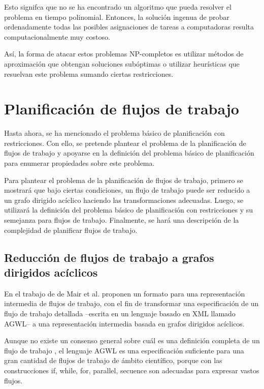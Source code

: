 Esto signifca que no se ha encontrado un algoritmo que pueda resolver el problema en tiempo polinomial. Entonces, la solución ingenua de probar ordenadamente todas las posibles asignaciones de tareas a computadoras resulta computacionalmente muy costoso.

Así, la forma de atacar estos problemas NP-completos es utilizar métodos de aproximación \cite{leiserson2001introduction} que obtengan soluciones subóptimas o utilizar heurísticas que resuelvan este problema sumando ciertas restricciones.

\section{Planificación de flujos de trabajo}
Hasta ahora, se ha mencionado el problema básico de planificación con restricciones. Con ello, se pretende plantear el problema de la planificación de flujos de trabajo y apoyarse en la definición del problema básico de planificación para enumerar propiedades sobre este problema.

Para plantear el problema de la planificación de flujos de trabajo, primero se mostrará que bajo ciertas condiciones, un flujo de trabajo puede ser reducido a un grafo dirigido acíclico haciendo las transformaciones adecuadas. Luego, se utilizará la definición del problema básico de planificación con restricciones y su semejanza para flujos de trabajo. Finalmente, se hará una descripción de la complejidad de planificar flujos de trabajo.
\subsection{Reducción de flujos de trabajo a grafos dirigidos acíclicos}
En el trabajo de de Mair et al. \cite{mair2007workflow} proponen un formato para una representación intermedia de flujos de trabajo, con el fin de transformar una especificación de un flujo de trabajo detallada --escrita en un lenguaje basado en XML llamado AGWL-- a una representación intermedia basada en grafos dirigidos acíclicos.

Aunque no existe un consenso general sobre cuál es una definición completa de un flujo de trabajo \cite{van2003workflow}, el lenguaje AGWL es una especificación suficiente para una gran cantidad de flujos de trabajo de ámbito científico, porque con las construcciones if, while, for, parallel, secuence son adecuadas para expresar vastos flujos.

